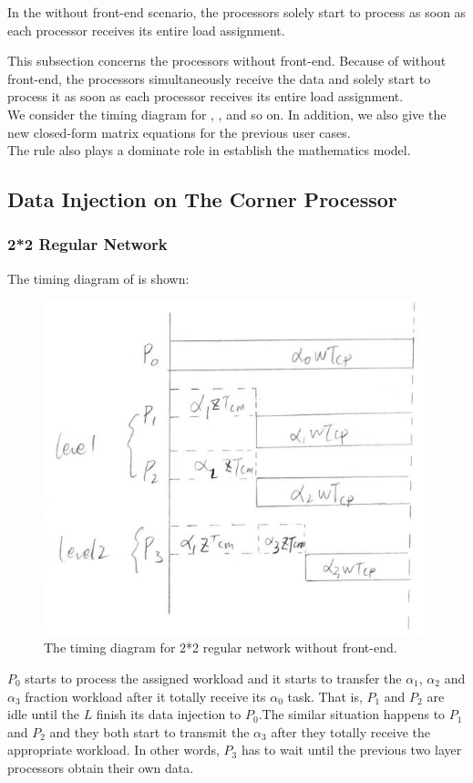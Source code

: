 
In the without front-end scenario, the processors solely start to process as soon as each processor receives its entire load assignment\cite{gamboa2011simple}.  

This subsection concerns the processors without front-end.  Because of without front-end, the processors simultaneously receive the data and solely start to process it as soon as each processor receives its entire load assignment.  \\
We consider the timing diagram for , ,  and so on.   In addition, we also give the new closed-form matrix equations for the previous user cases.  \\
The rule also plays a dominate role in establish the mathematics model.  \\
\subsection{Data Injection on The Corner Processor}
\subsubsection{2*2 Regular Network}
The timing diagram of  is shown:

\begin{figure}[!ht]
\centering
\includegraphics[width=0.5\columnwidth]{figure/2t2d_no.JPG}
\caption{The timing diagram for 2*2 regular network without front-end.  }
\label{fig:2t2d_no}
\end{figure}
\newpage 

$P_{0}$ starts to process the assigned workload and it starts to transfer the $\alpha_{1}$, $\alpha_{2}$  and $\alpha_{3}$ fraction workload after it totally receive its $\alpha_{0}$ task.  That is,  $P_{1}$ and $P_{2}$ are idle until the $L$ finish its data injection to $P_{0}.  $The similar situation happens to $P_{1}$ and $P_{2}$ and they both start to transmit the $\alpha_{3}$ after they totally receive the appropriate workload.  In other words, $P_{3}$ has to wait until the previous two layer processors obtain their own data. 

